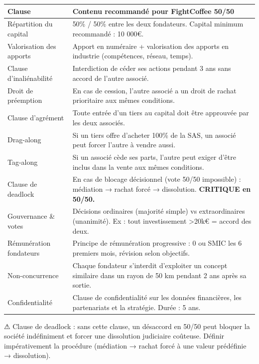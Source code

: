 \documentclass[11pt, a4paper]{article}
\begin{document}
\begin{center}
\begin{tabular}{@{}p{4cm}p{9cm}@{}}
\toprule
\rowcolor{fc-ink}\color{white}\textbf{Clause} & \color{white}\textbf{Contenu recommandé pour FightCoffee 50/50} \\
\midrule
Répartition du capital & 50\% / 50\% entre les deux fondateurs. Capital minimum recommandé : 10 000€. \\
\rowcolor{fc-bg2} Valorisation des apports & Apport en numéraire + valorisation des apports en industrie (compétences, réseau, temps). \\
Clause d'inaliénabilité & Interdiction de céder ses actions pendant 3 ans sans accord de l'autre associé. \\
\rowcolor{fc-bg2} Droit de préemption & En cas de cession, l'autre associé a un droit de rachat prioritaire aux mêmes conditions. \\
Clause d'agrément & Toute entrée d'un tiers au capital doit être approuvée par les deux associés. \\
\rowcolor{fc-bg2} Drag-along & Si un tiers offre d'acheter 100\% de la SAS, un associé peut forcer l'autre à vendre aussi. \\
Tag-along & Si un associé cède ses parts, l'autre peut exiger d'être inclus dans la vente aux mêmes conditions. \\
\rowcolor{fc-bg2} Clause de deadlock & En cas de blocage décisionnel (vote 50/50 impossible) : médiation → rachat forcé → dissolution. \textbf{CRITIQUE en 50/50.} \\
Gouvernance \& votes & Décisions ordinaires (majorité simple) vs extraordinaires (unanimité). Ex : tout investissement >20k€ = accord des deux. \\
\rowcolor{fc-bg2} Rémunération fondateurs & Principe de rémunération progressive : 0 ou SMIC les 6 premiers mois, révision selon objectifs. \\
Non-concurrence & Chaque fondateur s'interdit d'exploiter un concept similaire dans un rayon de 50 km pendant 2 ans après sa sortie. \\
\rowcolor{fc-bg2} Confidentialité & Clause de confidentialité sur les données financières, les partenariats et la stratégie. Durée : 5 ans. \\
\bottomrule
\end{tabular}
\end{center}

\begin{warnbox}
⚠ Clause de deadlock : sans cette clause, un désaccord en 50/50 peut bloquer la société indéfiniment et forcer une dissolution judiciaire coûteuse. Définir impérativement la procédure (médiation → rachat forcé à une valeur prédéfinie → dissolution).
\end{warnbox}
\end{document}
